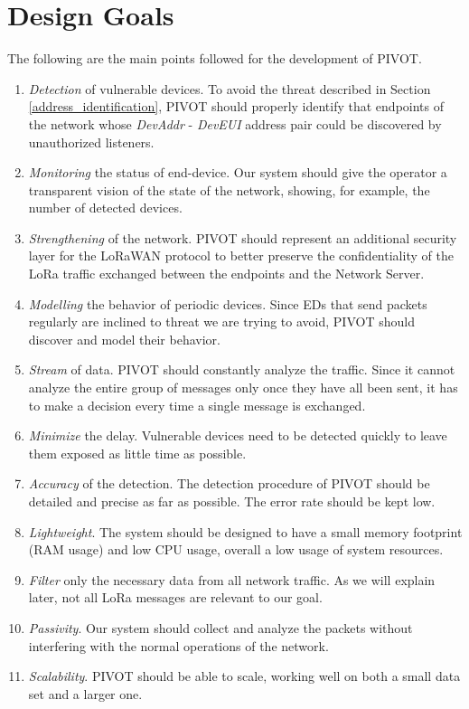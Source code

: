 \section{Design Goals}
\label{goals}
The following are the main points followed for the development of PIVOT.
\begin{enumerate}
	\item \textit {Detection} of vulnerable devices. To avoid the threat described in Section \ref {address_identification}, PIVOT should properly identify that endpoints of the network whose \textit {DevAddr} - \textit {DevEUI} address pair could be discovered by unauthorized listeners.
	\item \textit{Monitoring} the status of end-device. Our system should give the operator a transparent vision of the state of the network, showing, for example, the number of detected devices. 
	\item \textit{Strengthening} of the network. PIVOT should represent an additional security layer for the LoRaWAN protocol to better preserve the confidentiality of the LoRa traffic exchanged between the endpoints and the Network Server.
	\item \textit{Modelling} the behavior of periodic devices. Since EDs that send packets regularly are inclined to threat we are trying to avoid, PIVOT should discover and model their behavior.
	\item \textit{Stream} of data. PIVOT should constantly analyze the traffic. Since it cannot analyze the entire group of messages only once they have all been sent, it has to make a decision every time a single message is exchanged.
	\item \textit{Minimize} the delay. Vulnerable devices need to be detected quickly to leave them exposed as little time as possible.
	\item \textit{Accuracy} of the detection. The detection procedure of PIVOT should be detailed and precise as far as possible. The error rate should be kept low.
	\item \textit{Lightweight}. The system should be designed to have a small memory footprint (RAM usage) and low CPU usage, overall a low usage of system resources.
	\item \textit{Filter} only the necessary data from all network traffic. As we will explain later, not all LoRa messages are relevant to our goal.
	\item \textit{Passivity}. Our system should collect and analyze the packets without interfering with the normal operations of the network.
	\item \textit{Scalability}. PIVOT should be able to scale, working well on both a small data set and a larger one.
\end{enumerate}


